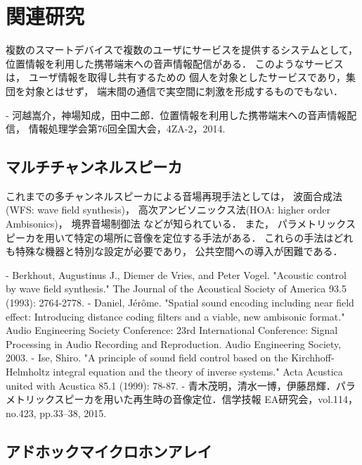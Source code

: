 \chapter{関連研究}

複数のスマートデバイスで複数のユーザにサービスを提供するシステムとして，
位置情報を利用した携帯端末への音声情報配信がある．
このようなサービスは，
ユーザ情報を取得し共有するための
個人を対象としたサービスであり，集団を対象とはせず，
端末間の通信で実空間に刺激を形成するものでもない．

- 河越嵩介，神場知成，田中二郎．位置情報を利用した携帯端末への音声情報配信，
情報処理学会第76回全国大会，4ZA-2，2014.

\section{マルチチャンネルスピーカ}

これまでの多チャンネルスピーカによる音場再現手法としては，
波面合成法(WFS: wave field synthesis)，
高次アンビソニックス法(HOA: higher order Ambisonics)，
境界音場制御法
などが知られている．
また，
パラメトリックスピーカを用いて特定の場所に音像を定位する手法がある．
これらの手法はどれも特殊な機器と特別な設定が必要であり，
公共空間への導入が困難である．

- Berkhout, Augustinus J., Diemer de Vries, and Peter Vogel. "Acoustic control by wave field synthesis." The Journal of the Acoustical Society of America 93.5 (1993): 2764-2778.
- Daniel, Jérôme. "Spatial sound encoding including near field effect: Introducing distance coding filters and a viable, new ambisonic format." Audio Engineering Society Conference: 23rd International Conference: Signal Processing in Audio Recording and Reproduction. Audio Engineering Society, 2003.
- Ise, Shiro. "A principle of sound field control based on the Kirchhoff-Helmholtz integral equation and the theory of inverse systems." Acta Acustica united with Acustica 85.1 (1999): 78-87.
- 青木茂明，清水一博，伊藤昂輝．パラメトリックスピーカを用いた再生時の音像定位．信学技報 EA研究会，vol.114，no.423, pp.33--38, 2015.

\section{アドホックマイクロホンアレイ}

